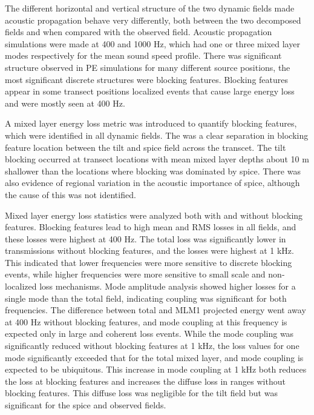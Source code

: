 \documentclass[preprint,NumberedRefs]{JASA}
\begin{document}
The different horizontal and vertical structure of the two dynamic fields made acoustic propagation behave very differently, both between the two decomposed fields and when compared with the observed field. Acoustic propagation simulations were made at 400 and 1000 Hz, which had one or three mixed layer modes respectively for the mean sound speed profile. There was significant structure observed in PE simulations for many different source positions, the most significant discrete structures were blocking features. Blocking features appear in some transect positions localized events that cause large energy loss and were mostly seen at 400 Hz.

A mixed layer energy loss metric was introduced to quantify blocking features, which were identified in all dynamic fields. The was a clear separation in blocking feature location between the tilt and spice field across the transcet. The tilt blocking occurred at transect locations with mean mixed layer depths about 10 m shallower than the locations where blocking was dominated by spice. There was also evidence of regional variation in the acoustic importance of spice, although the cause of this was not identified.

Mixed layer energy loss statistics were analyzed both with and without blocking features. Blocking features lead to high mean and RMS losses in all fields, and these losses were highest at 400 Hz. The total loss was significantly lower in transmissions without blocking features, and the losses were highest at 1 kHz. This indicated that lower frequencies were more sensitive to discrete blocking events, while higher frequencies were more sensitive to small scale and non-localized loss mechanisms. Mode amplitude analysis showed higher losses for a single mode than the total field, indicating coupling was significant for both frequencies. The difference between total and MLM1 projected energy went away at 400 Hz without blocking features, and mode coupling at this frequency is expected only in large and coherent loss events. While the mode coupling was significantly reduced without blocking features at 1 kHz, the loss values for one mode significantly exceeded that for the total mixed layer, and mode coupling is expected to be ubiquitous. This increase in mode coupling at 1 kHz both reduces the loss at blocking features and increases the diffuse loss in ranges without blocking features. This diffuse loss was negligible for the tilt field but was significant for the spice and observed fields.



\end{document}
